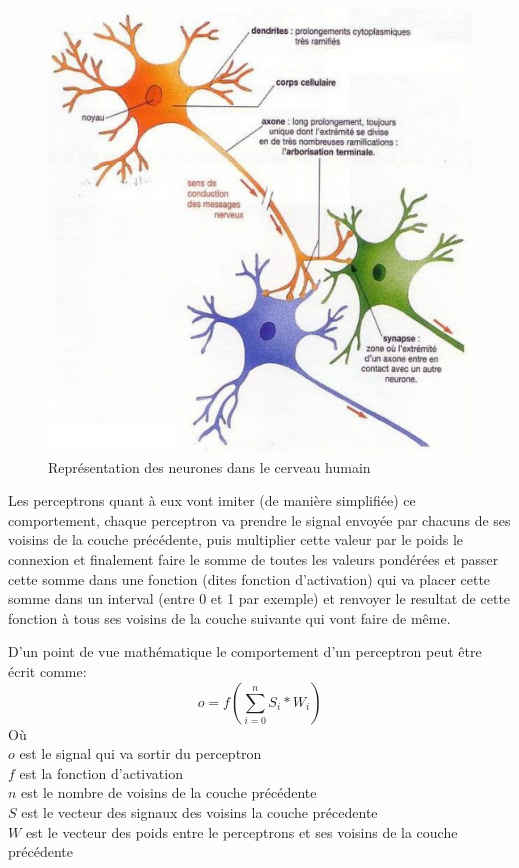 \documentclass{article}
\begin{document}
\begin{figure}[h]
\begin{center}
	\includegraphics[scale=0.5]{neurones.png}
	\caption{Représentation des neurones dans le cerveau humain}
\end{center}
\end{figure}

Les perceptrons quant à eux vont imiter (de manière simplifiée) ce comportement, chaque perceptron va prendre le signal envoyée par chacuns de ses voisins de la couche précédente, puis multiplier cette valeur par le poids le connexion et finalement faire le somme de toutes les valeurs pondérées et passer cette somme dans une fonction (dites fonction d'activation) qui va placer cette somme dans un interval (entre 0 et 1 par exemple) et renvoyer le resultat de cette fonction à tous ses voisins de la couche suivante qui vont faire de même.

D'un point de vue mathématique le comportement d'un perceptron peut être écrit comme:
\begin{equation}
o = f(\sum_{i=0}^{n} S_i * W_i)
\end{equation}
Où\\
$o$ est le signal qui va sortir du perceptron\\
$f$ est la fonction d'activation\\
$n$ est le nombre de voisins de la couche précédente\\
$S$ est le vecteur des signaux des voisins la couche précedente\\
$W$ est le vecteur des poids entre le perceptrons et ses voisins de la couche précédente
\end{document}
